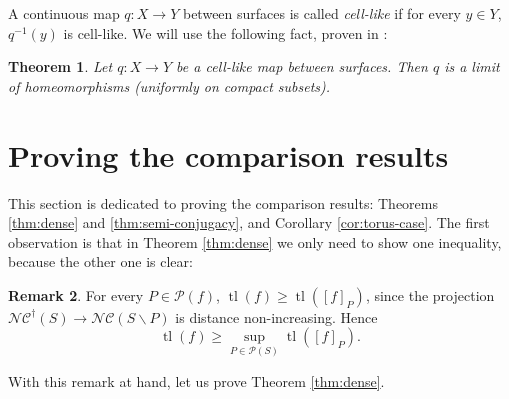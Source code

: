 \documentclass{amsart}
\newcommand{\Pf}{\mathcal{P}}
\newcommand{\NC}{\mathcal{NC}}
\newcommand{\NCdagger}{\NC^\dagger}
\newcommand{\tl}[1]{\operatorname{tl}(#1)}
\newcommand{\ssm}{\smallsetminus}
\newtheorem{thm}{Theorem}[section]
\theoremstyle{definition}
\newtheorem{rmk}[thm]{Remark}
\begin{document}
 A continuous map \(q:X\to Y\) between surfaces is called \emph{cell-like} if for every \(y\in Y\), \(q^{-1}(y)\) is cell-like.
We will use the following fact, proven in \cite{mr_topology}:
\begin{thm}\label{thm:cell-like}
Let \(q:X\to Y\) be a cell-like map between surfaces. Then \(q\) is a limit of homeomorphisms (uniformly on compact subsets).
\end{thm}

\section{Proving the comparison results}
This section is dedicated to proving the comparison results: Theorems \ref{thm:dense} and \ref{thm:semi-conjugacy}, and Corollary \ref{cor:torus-case}. The first observation is that in Theorem \ref{thm:dense} we only need to show one inequality, because the other one is clear:

\begin{rmk}\label{rmk:inequality}
For every \(P\in\Pf(f)\), \(\tl{f}\geq \tl{[f]_{P}}\), since the projection \(\NCdagger(S)\to\NC(S\ssm P)\) is distance non-increasing. Hence 
\[\tl{f}\geq \sup_{P\in\Pf(S)}\tl{[f]_{P}}.\]
\end{rmk}

With this remark at hand, let us prove Theorem \ref{thm:dense}.
\end{document}
